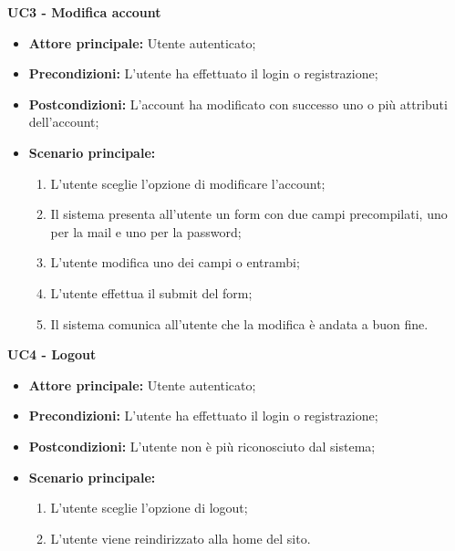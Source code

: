 
\textbf{UC3 - Modifica account}
\begin{itemize}
    \item \textbf{Attore principale: }Utente autenticato;
    \item \textbf{Precondizioni: }L'utente ha effettuato il login o registrazione;
    \item \textbf{Postcondizioni: }L'account ha modificato con successo uno o più attributi dell'account;
    \item \textbf{Scenario principale:}
        \begin{enumerate}
            \item L'utente sceglie l'opzione di modificare l'account;
            \item Il sistema presenta all'utente un form con due campi precompilati, uno per la mail e uno per la password;
            \item L'utente modifica uno dei campi o entrambi;
            \item L'utente effettua il submit del form;
            \item Il sistema comunica all'utente che la modifica è andata a buon fine.
        \end{enumerate}
\end{itemize}

\textbf{UC4 - Logout}
\begin{itemize}
    \item \textbf{Attore principale: }Utente autenticato;
    \item \textbf{Precondizioni: }L'utente ha effettuato il login o registrazione;
    \item \textbf{Postcondizioni: }L'utente non è più riconosciuto dal sistema;
    \item \textbf{Scenario principale:}
        \begin{enumerate}
            \item L'utente sceglie l'opzione di logout;
            \item L'utente viene reindirizzato alla home del sito.
        \end{enumerate}
\end{itemize}

